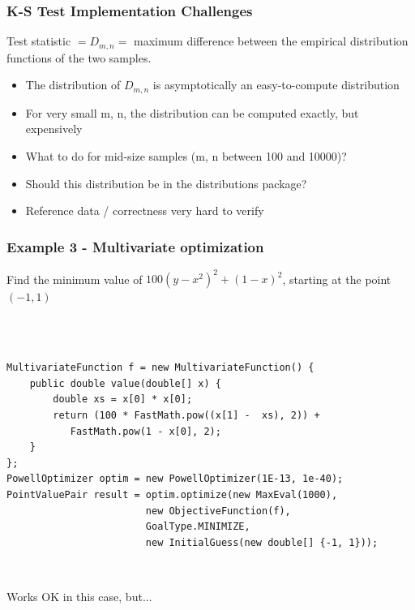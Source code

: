 \documentclass[14pt,mathserif]{beamer}
\begin{document}
\begin{frame}
  \frametitle{K-S Test Implementation Challenges}
\begin{small}
Test statistic \( = D_{m,n} = \) maximum difference between the empirical
distribution functions of the two samples. \\
 \begin{itemize}
  \item The distribution of \(D_{m,n}\) is asymptotically an easy-to-compute distribution
  \item For very small m, n, the distribution can be computed exactly, but expensively
  \item What to do for mid-size samples (m, n between 100 and 10000)?
  \item Should this distribution be in the distributions package?
  \item Reference data / correctness very hard to verify
 \end{itemize}
\end{small}
\end{frame}
\begin{frame}[fragile]
  \frametitle{Example 3 - Multivariate optimization}

\begin{small}
Find the minimum value of \(100(y-x^2)^2 + (1-x)^2\), starting at the point \((-1, 1)\)
\end{small}
\\
\begin{verbatim}

MultivariateFunction f = new MultivariateFunction() {
    public double value(double[] x) {
        double xs = x[0] * x[0];
        return (100 * FastMath.pow((x[1] -  xs), 2)) +
           FastMath.pow(1 - x[0], 2);
    }
};
PowellOptimizer optim = new PowellOptimizer(1E-13, 1e-40);
PointValuePair result = optim.optimize(new MaxEval(1000),
                        new ObjectiveFunction(f),
                        GoalType.MINIMIZE,
                        new InitialGuess(new double[] {-1, 1}));
\end{verbatim}
\\
\begin{small}
Works OK in this case, but...
\end{small}
\end{frame}
\end{document}
